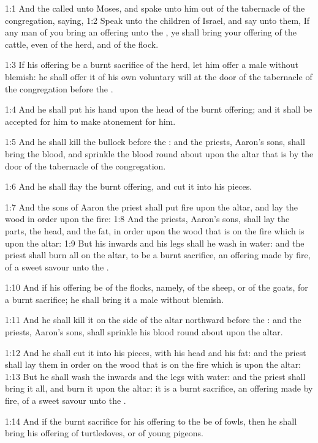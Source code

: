 

1:1 And the \LORD called unto Moses, and spake unto him out of the tabernacle of the congregation, saying, 1:2 Speak unto the children of Israel, and say unto them, If any man of you bring an offering unto the \LORD, ye shall bring your offering of the cattle, even of the herd, and of the flock.

1:3 If his offering be a burnt sacrifice of the herd, let him offer a male without blemish: he shall offer it of his own voluntary will at the door of the tabernacle of the congregation before the \LORD.

1:4 And he shall put his hand upon the head of the burnt offering; and it shall be accepted for him to make atonement for him.

1:5 And he shall kill the bullock before the \LORD: and the priests, Aaron's sons, shall bring the blood, and sprinkle the blood round about upon the altar that is by the door of the tabernacle of the congregation.

1:6 And he shall flay the burnt offering, and cut it into his pieces.

1:7 And the sons of Aaron the priest shall put fire upon the altar, and lay the wood in order upon the fire: 1:8 And the priests, Aaron's sons, shall lay the parts, the head, and the fat, in order upon the wood that is on the fire which is upon the altar: 1:9 But his inwards and his legs shall he wash in water: and the priest shall burn all on the altar, to be a burnt sacrifice, an offering made by fire, of a sweet savour unto the \LORD.

1:10 And if his offering be of the flocks, namely, of the sheep, or of the goats, for a burnt sacrifice; he shall bring it a male without blemish.

1:11 And he shall kill it on the side of the altar northward before the \LORD: and the priests, Aaron's sons, shall sprinkle his blood round about upon the altar.

1:12 And he shall cut it into his pieces, with his head and his fat: and the priest shall lay them in order on the wood that is on the fire which is upon the altar: 1:13 But he shall wash the inwards and the legs with water: and the priest shall bring it all, and burn it upon the altar: it is a burnt sacrifice, an offering made by fire, of a sweet savour unto the \LORD.

1:14 And if the burnt sacrifice for his offering to the \LORD be of fowls, then he shall bring his offering of turtledoves, or of young pigeons.

